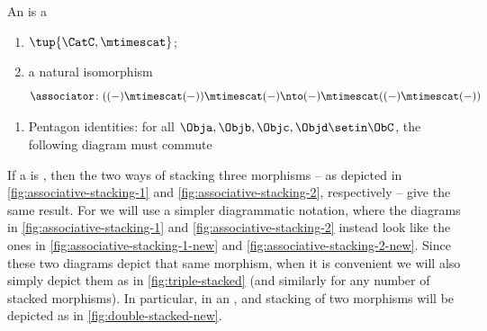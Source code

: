 \begin{ctdefinition}
    \label{def:assoc-stacking-cat}
    An  is a \
    
    \constit 
    \begin{enumerate}
        \item {} $\tup{\CatC, \mtimescat}$;
        \item a natural isomorphism
        \begin{equation}
\associator \colon (( - ) \mtimescat ( - )) \mtimescat ( - ) \nto ( - ) \mtimescat (( - ) \mtimescat ( - ))
\end{equation}
    \end{enumerate}
  
    \condit
    \begin{enumerate}
        \item Pentagon identities: for all $\Obja,\Objb,\Objc,\Objd\setin \ObC$, the following diagram must commute
    \end{enumerate}
\end{ctdefinition}

If a  is , then the two ways of stacking three morphisms -- as depicted in \cref{fig:associative-stacking-1} and \cref{fig:associative-stacking-2}, respectively -- give the same result.
For   we will use a simpler diagrammatic notation, where the diagrams in \cref{fig:associative-stacking-1} and \cref{fig:associative-stacking-2} instead look like the ones in \cref{fig:associative-stacking-1-new} and \cref{fig:associative-stacking-2-new}.
Since these two diagrams depict that same morphism, when it is convenient we will also simply depict them as in \cref{fig:triple-stacked} (and similarly for any number of stacked morphisms).
In particular, in an  , and stacking of two morphisms will be depicted as in \cref{fig:double-stacked-new}.

\begin{marginfigure}[]
    \centering
    \caption{Associative stacking of three morphisms, in one order.}
    \label{fig:associative-stacking-1-new}
\end{marginfigure}

